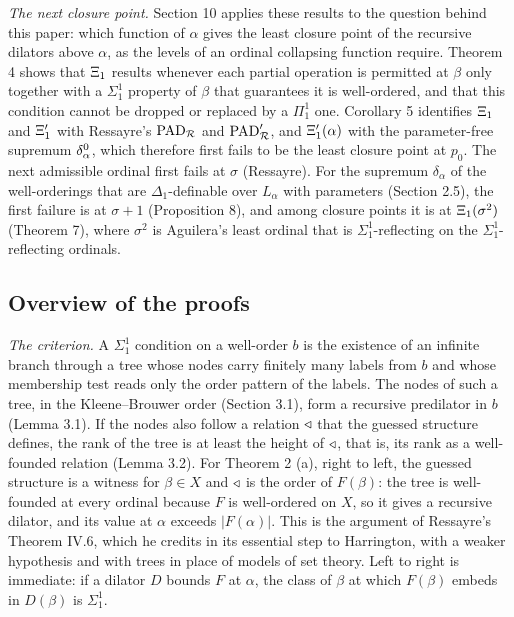 \documentclass[11pt]{article}
\begin{document}
\emph{The next closure point.} Section 10 applies these results to the question behind this paper: which function
of $\alpha$ gives the least closure point of the recursive dilators above $\alpha$, as the levels of an ordinal
collapsing function require. Theorem 4 shows that $\Xi_1$ results whenever each partial operation is permitted at
$\beta$ only together with a $\Sigma^1_1$ property of $\beta$ that guarantees it is well-ordered, and that this
condition cannot be dropped or replaced by a $\Pi^1_1$ one. Corollary 5 identifies $\Xi_1$ and $\Xi'_1$ with Ressayre's
$\mathrm{PAD}_{\mathcal R}$ and $\mathrm{PAD}'_{\mathcal R}$, and $\Xi'_1(\alpha)$ with the parameter-free supremum $\delta^0_{\alpha}$, which therefore first fails to
be the least closure point at $p_0$. The next admissible ordinal first fails at $\sigma$ (Ressayre). For the
supremum $\delta_{\alpha}$ of the well-orderings that are $\Delta_1$-definable over $L_{\alpha}$ with parameters
(Section 2.5), the first failure is at $\sigma + 1$ (Proposition 8), and among closure points it is at
$\Xi_1(\sigma^2)$ (Theorem 7), where $\sigma^2$ is Aguilera's least ordinal that is $\Sigma^1_1$-reflecting on the
$\Sigma^1_1$-reflecting ordinals.

\subsection{Overview of the proofs}

\emph{The criterion.} A $\Sigma^1_1$ condition on a well-order $b$ is the existence of an infinite branch through a
tree whose nodes carry finitely many labels from $b$ and whose membership test reads only the order pattern of the
labels. The nodes of such a tree, in the Kleene--Brouwer order (Section 3.1), form a recursive predilator in $b$
(Lemma 3.1). If the nodes also follow a relation $\triangleleft$ that the guessed structure defines, the rank of the tree is
at least the height of $\triangleleft$, that is, its rank as a well-founded relation (Lemma 3.2). For Theorem 2 (a), right to
left, the guessed structure is a witness for $\beta \in X$ and $\triangleleft$ is the order of $F(\beta)$: the tree is
well-founded at every ordinal because $F$ is well-ordered on $X$, so it gives a recursive dilator, and its value
at $\alpha$ exceeds $|F(\alpha)|$. This is the argument of Ressayre's Theorem IV.6, which he credits in its
essential step to Harrington, with a weaker hypothesis and with trees in place of models of set theory. Left to
right is immediate: if a dilator $D$ bounds $F$ at $\alpha$, the class of $\beta$ at which $F(\beta)$ embeds in
$D(\beta)$ is $\Sigma^1_1$.
\end{document}
